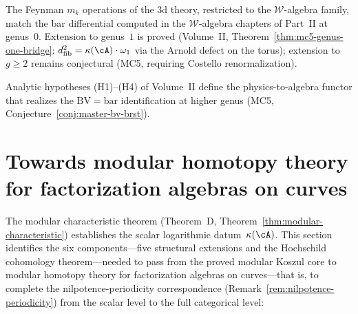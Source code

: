 \begin{proposition}
\label{conj:vol2-w-algebra-bridge}
The Feynman $m_k$ operations of the 3d theory, restricted to
the $\mathcal{W}$-algebra family, match the bar differential computed in the
$\mathcal{W}$-algebra chapters of Part~II at genus~$0$.
Extension to genus~$1$ is proved
(Volume~II, Theorem~\ref{thm:mc5-genus-one-bridge}:
$d_{\mathrm{fib}}^2 = \kappa(\cA)\cdot\omega_1$ via the Arnold
defect on the torus); extension to $g \geq 2$ remains conjectural
(MC5, requiring Costello renormalization).
\end{proposition}

\begin{conjecture}
\label{conj:vol2-bv-functor-bridge}
Analytic hypotheses (H1)--(H4) of Volume~II define the
physics-to-algebra functor that realizes the
$\mathrm{BV} = \mathrm{bar}$ identification at higher
genus (MC5, Conjecture~\ref{conj:master-bv-brst}).
\end{conjecture}


\section[Towards modular homotopy theory]{Towards modular homotopy theory for factorization algebras on curves}
\label{sec:modular-koszul-programme}

The modular characteristic theorem (Theorem~D,
Theorem~\ref{thm:modular-characteristic}) establishes the scalar
logarithmic datum~$\kappa(\cA)$.  This section identifies the six
components---five structural extensions and the Hochschild
cohomology theorem---needed to pass from the proved modular Koszul
core to modular homotopy theory for factorization algebras on
curves---that is, to complete the nilpotence-periodicity
correspondence
(Remark~\ref{rem:nilpotence-periodicity}) from the scalar level to
the full categorical level:

